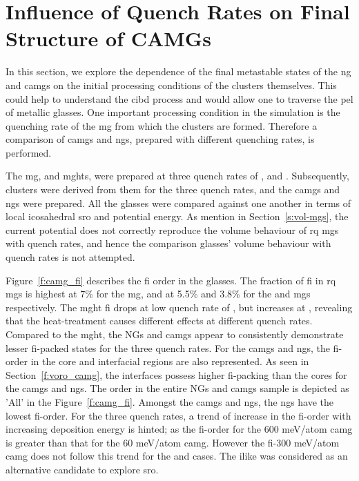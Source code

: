%
\section{Influence of Quench Rates on Final Structure of CAMGs} \label{s:camg_quenchrt}

\begin{changebar}
In this section, we explore the dependence of the final metastable states of the \gls{ng} and \gls{camg}s on the initial processing conditions of the clusters themselves. This could help to understand the \gls{cibd} process and would allow one to traverse the \gls{pel} of metallic glasses. One important processing condition in the simulation is the quenching rate of the \gls{mg} from which the clusters are formed. Therefore a comparison of \gls{camg}s and \gls{ng}s, prepared with different quenching rates, is performed. \par
\end{changebar}

The \gls{mg}, and \gls{mght}s, were prepared at three quench rates of ,  and . Subsequently, clusters were derived from them for the three quench rates, and the \gls{camg}s and \gls{ng}s were prepared. All the glasses were compared against one another in terms of local icosahedral \gls{sro} and potential energy. As mention in Section~\ref{s:vol-mgs}, the current potential does not correctly reproduce the volume behaviour of \gls{rq} \gls{mg}s with quench rates, and hence the comparison glasses' volume behaviour with quench rates is not attempted. \par

Figure~\ref{f:camg_fi} describes the \gls{fi} order in the glasses. The fraction of \gls{fi} in \gls{rq} \gls{mg}s is highest at 7\% for the  \gls{mg}, and at 5.5\% and 3.8\% for the  and  \gls{mg}s respectively. The \gls{mght} \gls{fi} drops at low quench rate of , but increases at , revealing that the heat-treatment causes different effects at different quench rates. Compared to the \gls{mght}, the NGs and \gls{camg}s appear to consistently demonstrate lesser \gls{fi}-packed states for the three quench rates. For the \gls{camg}s and \gls{ng}s, the \gls{fi}-order in the core and interfacial regions are also represented. As seen in Section~\ref{f:voro_camg}, the interfaces possess higher \gls{fi}-packing than the cores for the \gls{camg}s and \gls{ng}s. The order in the entire NGs and \gls{camg}s sample is depicted as 'All' in the Figure~\ref{f:camg_fi}. Amongst the \gls{camg}s and \gls{ng}s, the \gls{ng}s have the lowest \gls{fi}-order. For the three quench rates, a trend of increase in the \gls{fi}-order with increasing deposition energy is hinted; as the \gls{fi}-order for the 600 meV/atom \gls{camg} is greater than that for the 60 meV/atom \gls{camg}. However the \gls{fi}-300 meV/atom \gls{camg} does not follow this trend for the  and  cases. The \gls{ilike} was considered as an alternative candidate to explore \gls{sro}. \par

